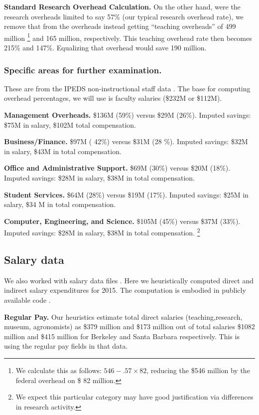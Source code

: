 \documentclass{article}
\begin{document}
{\bf Standard Research Overhead Calculation.} On the other hand, were
the research overheads limited to say 57\% (our typical research
overhead rate), we remove that from the overheads instead getting
``teaching overheads'' of 499 million \footnote{We calculate this as follows: $546 - .57\times 82$, reducing the \$546 million by the federal
overhead on \$ 82 million.} and 165
million, respectively.  This teaching overhead rate then becomes 215\%
and 147\%.  Equalizing that overhead would save 190 million.

\subsubsection{Specific areas for further examination.}

These are from the IPEDS non-instructional staff data
\cite{ipeds-nis}.  The base for computing overhead percentages, we
will use is faculty salaries (\$232M or \$112M).

{\bf Management Overheads.} \$136M (59\%) versus \$29M (26\%). Imputed
savings: \$75M in salary, \$102M total compensation.

{\bf Business/Finance.} \$97M ( 42\%) versus \$31M (28 \%). Imputed savings:
\$32M in salary, \$43M in total compensation.

{\bf Office and Administrative Support.}  \$69M (30\%) versus
\$20M (18\%). Imputed savings: \$28M in salary, \$38M in total compensation.

{\bf Student Services.} \$64M (28\%) versus \$19M (17\%). Imputed savings:
\$25M in salary, \$34 M in total compensation. 

{\bf Computer, Engineering, and Science.} \$105M (45\%) versus \$37M
(33\%). Imputed savings: \$28M in salary, \$38M in total compensation.
\footnote{We expect this particular category may have good justification via differences in research activity.}


\subsection{Salary data}

We also worked with salary data files \cite{salary}.
Here we heuristically computed direct and indirect
salary expenditures for 2015. The computation is embodied in publicly
available code \cite{github-link}.

{\bf Regular Pay.}  Our heuristics estimate total direct salaries
(teaching,research, museum, agronomists) as \$379 million and \$173
million out of total salaries \$1082 million and \$415 million for
Berkeley and Santa Barbara respectively.  This is using the regular
pay fields in that data.
\end{document}
